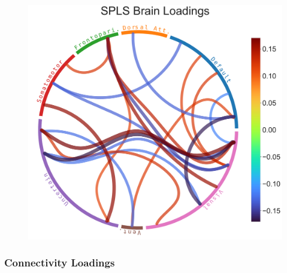 \begin{figure}
\includegraphics[width=0.49\linewidth]{figures/regularization/hcp/SPLS brain weights.pdf}
\caption{}\label{}
\end{figure}

\subsubsection{Connectivity Loadings}
